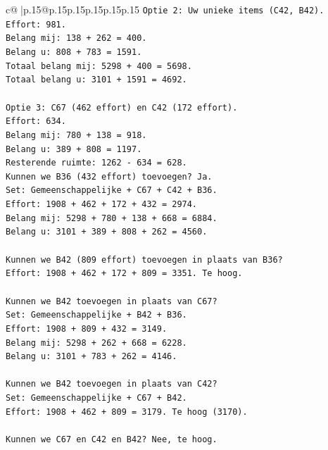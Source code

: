\documentclass{article}
\begin{document}
{\begin{supertabular}{c@{$\;$}|p{.15\linewidth}@{}p{.15\linewidth}p{.15\linewidth}p{.15\linewidth}p{.15\linewidth}p{.15\linewidth}}
{{{\texttt{Optie 2: Uw unieke items (C42, B42).} \\
\texttt{Effort: 981.} \\
\texttt{Belang mij: 138 + 262 = 400.} \\
\texttt{Belang u: 808 + 783 = 1591.} \\
\texttt{Totaal belang mij: 5298 + 400 = 5698.} \\
\texttt{Totaal belang u: 3101 + 1591 = 4692.} \\
\\ 
\texttt{Optie 3: C67 (462 effort) en C42 (172 effort).} \\
\texttt{Effort: 634.} \\
\texttt{Belang mij: 780 + 138 = 918.} \\
\texttt{Belang u: 389 + 808 = 1197.} \\
\texttt{Resterende ruimte: 1262 {-} 634 = 628.} \\
\texttt{Kunnen we B36 (432 effort) toevoegen? Ja.} \\
\texttt{Set: Gemeenschappelijke + C67 + C42 + B36.} \\
\texttt{Effort: 1908 + 462 + 172 + 432 = 2974.} \\
\texttt{Belang mij: 5298 + 780 + 138 + 668 = 6884.} \\
\texttt{Belang u: 3101 + 389 + 808 + 262 = 4560.} \\
\\ 
\texttt{Kunnen we B42 (809 effort) toevoegen in plaats van B36?} \\
\texttt{Effort: 1908 + 462 + 172 + 809 = 3351. Te hoog.} \\
\\ 
\texttt{Kunnen we B42 toevoegen in plaats van C67?} \\
\texttt{Set: Gemeenschappelijke + B42 + B36.} \\
\texttt{Effort: 1908 + 809 + 432 = 3149.} \\
\texttt{Belang mij: 5298 + 262 + 668 = 6228.} \\
\texttt{Belang u: 3101 + 783 + 262 = 4146.} \\
\\ 
\texttt{Kunnen we B42 toevoegen in plaats van C42?} \\
\texttt{Set: Gemeenschappelijke + C67 + B42.} \\
\texttt{Effort: 1908 + 462 + 809 = 3179. Te hoog (3170).} \\
\\ 
\texttt{Kunnen we C67 en C42 en B42? Nee, te hoog.} \\
}}}
\end{supertabular}}
\end{document}
